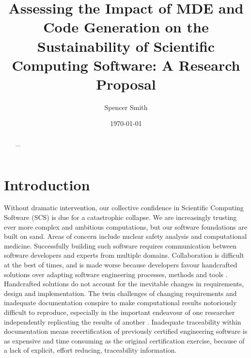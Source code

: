 \documentclass[12pt]{article}
\begin{document}
\title{Assessing the Impact of MDE and Code Generation on the Sustainability of
  Scientific Computing Software: A Research Proposal} 
\author{Spencer Smith}
\date{\today}
	
\maketitle

\begin{abstract}
  ...
\end{abstract}

\tableofcontents

\newpage

\section{Introduction}

Without dramatic intervention, our collective confidence in Scientific Computing
Software (SCS) is due for a catastrophic collapse.  We are increasingly trusting
ever more complex and ambitious computations, but our software foundations are
built on sand. Areas of concern include nuclear safety analysis and
computational medicine. Successfully building such software requires
communication between software developers and experts from multiple
domains. Collaboration is difficult at the best of times, and is made worse
because developers favour handcrafted solutions over adapting software
engineering processes, methods and tools \citep{FaulkEtAl2009}. Handcrafted
solutions do not account for the inevitable changes in requirements, design and
implementation. The twin challenges of changing requirements and inadequate
documentation conspire to make computational results notoriously difficult to
reproduce, especially in the important endeavour of one researcher independently
replicating the results of another \citep{Smith2018}.  Inadequate traceability
within documentation means re­certification of previously certified engineering
software is as expensive and time consuming as the original certification
exercise, because of a lack of explicit, effort reducing, traceability
information.
\end{document}
